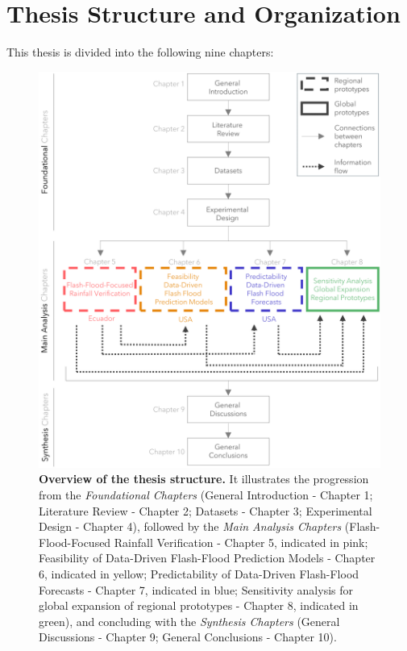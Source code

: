 \section{Thesis Structure and Organization}
This thesis is divided into the following nine chapters:

\begin{figure}[htbp]
\centering
\includegraphics[width=\textwidth]{Figures/Chapter_01/01_thesis_roadmap.png}
\caption{\textbf{Overview of the thesis structure.} It illustrates the progression from the \textit{Foundational Chapters} (General Introduction - Chapter 1; Literature Review - Chapter 2; Datasets - Chapter 3; Experimental Design - Chapter 4), followed by the \textit{Main Analysis Chapters} (Flash-Flood-Focused Rainfall Verification - Chapter 5, indicated in pink; Feasibility of Data-Driven Flash-Flood Prediction Models - Chapter 6, indicated in yellow; Predictability of Data-Driven Flash-Flood Forecasts - Chapter 7, indicated in blue; Sensitivity analysis for global expansion of regional prototypes - Chapter 8, indicated in green), and concluding with the \textit{Synthesis Chapters} (General Discussions - Chapter 9; General Conclusions - Chapter 10).}
\label{fig:thesis_structure}
\end{figure}


